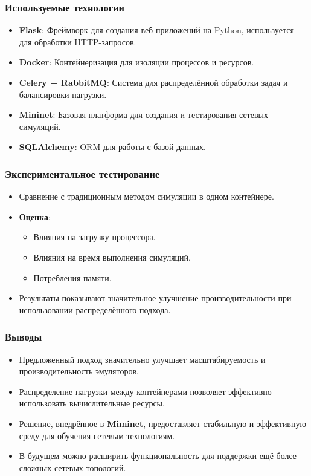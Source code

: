 \documentclass{beamer}
\begin{document}
\begin{frame}[fragile]
  \frametitle{Используемые технологии}
  \begin{itemize}
    \item \textbf{Flask}: Фреймворк для создания веб-приложений на Python, используется для обработки HTTP-запросов.
    \item \textbf{Docker}: Контейнеризация для изоляции процессов и ресурсов.
    \item \textbf{Celery + RabbitMQ}: Система для распределённой обработки задач и балансировки нагрузки.
    \item \textbf{Mininet}: Базовая платформа для создания и тестирования сетевых симуляций.
    \item \textbf{SQLAlchemy}: ORM для работы с базой данных.
  \end{itemize}
\end{frame}

\begin{frame}[fragile]
  \frametitle{Экспериментальное тестирование}
  \begin{itemize}
    \item Сравнение с традиционным методом симуляции в одном контейнере.
    \item \textbf{Оценка}:
    \begin{itemize}
      \item Влияния на загрузку процессора.
      \item Влияния на время выполнения симуляций.
      \item Потребления памяти.
    \end{itemize}
    \item Результаты показывают значительное улучшение производительности при использовании распределённого подхода.
  \end{itemize}
\end{frame}

\begin{frame}[fragile]
  \frametitle{Выводы}
  \begin{itemize}
    \item Предложенный подход значительно улучшает масштабируемость и производительность эмуляторов.
    \item Распределение нагрузки между контейнерами позволяет эффективно использовать вычислительные ресурсы.
    \item Решение, внедрённое в \textbf{Miminet}, предоставляет стабильную и эффективную среду для обучения сетевым технологиям.
    \item В будущем можно расширить функциональность для поддержки ещё более сложных сетевых топологий.
  \end{itemize}
\end{frame}
\end{document}
